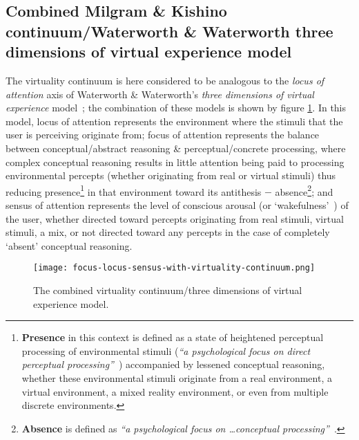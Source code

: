 \subsection{Combined Milgram \& Kishino continuum/Waterworth \& Waterworth three dimensions of virtual experience model}

\newcommand{\presencefootnote}{\footnote{\textbf{Presence} in this context is defined as a state of heightened perceptual processing of environmental stimuli (\textit{``a psychological focus on direct perceptual processing''}~\cite{Waterworth2001}) accompanied by lessened conceptual reasoning, whether these environmental stimuli originate from a real environment, a virtual environment, a mixed reality environment, or even from multiple discrete environments.}}

\newcommand{\absencefootnote}{\footnote{\textbf{Absence} is defined as \textit{``a psychological focus on \ldots conceptual processing''}~\cite{Waterworth2001}.}}

The virtuality continuum is here considered to be analogous to the \textit{locus of attention} axis of Waterworth \& Waterworth's \textit{three dimensions of virtual experience} model~\cite{Waterworth2001}; the combination of these models is shown by figure \ref{focus-locus-sensus-with-virtuality-continuum}. In this model, locus of attention represents the environment where the stimuli that the user is perceiving originate from; focus of attention represents the balance between conceptual/abstract reasoning \& perceptual/concrete processing, where complex conceptual reasoning results in little attention being paid to processing environmental percepts (whether originating from real or virtual stimuli) thus reducing presence\presencefootnote{} in that environment toward its antithesis $-$ absence\absencefootnote{}; and sensus of attention represents the level of conscious arousal (or `wakefulness'~\cite{Laureys2009}) of the user, whether directed toward percepts originating from real stimuli, virtual stimuli, a mix, or not directed toward any percepts in the case of completely `absent' conceptual reasoning.

\begin{figure}[h]
	\begin{center}
		\texttt{[image: focus-locus-sensus-with-virtuality-continuum.png]}
		\caption{The combined virtuality continuum/three dimensions of virtual experience model.}
		\label{focus-locus-sensus-with-virtuality-continuum}
	\end{center}	
\end{figure}

